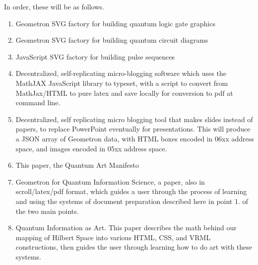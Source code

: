 \documentclass[11pt]{article}
\begin{document}
In order, these will be as follows.
\begin{enumerate}

    \item
Geometron SVG factory for building quantum logic gate graphics
    \item
Geometron SVG factory for building quantum circuit diagrams
    \item
JavaScript SVG factory for building pulse sequences
    \item
Decentralized, self-replicating micro-blogging software which uses the MathJAX JavaScript library to typeset, with a script to convert from MathJax/HTML to pure latex and save locally for conversion to pdf at command line.
    \item
Decentralized, self replicating micro blogging tool that makes slides instead of papers, to replace PowerPoint eventually for presentations.  This will produce a JSON array of Geometron data, with HTML boxes encoded in 06xx address space, and images encoded in 05xx address space.
    \item
This paper, the Quantum Art Manifesto
    \item
Geometron for Quantum Information Science, a paper, also in scroll/latex/pdf format, which guides a user through the process of learning and using the systems of document preparation described here in point 1. of the two main points.
    \item
Quantum Information as Art.  This paper describes the math behind our mapping of Hilbert Space into various HTML, CSS, and VRML constructions, then guides the user through learning how to do art with these systems.
\end{enumerate}
\end{document}
